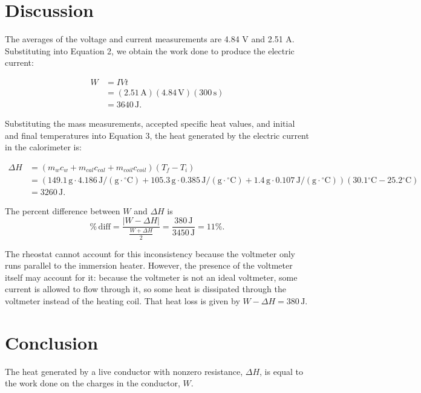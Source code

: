 \documentclass[11pt, titlepage, letterpaper, twoside]{article}
\begin{document}
\section{Discussion}

The averages of the voltage and current measurements are 4.84 V and 2.51 A. Substituting into Equation 2, we obtain the work done to produce the electric
current:

\begin{align*}
W &= IVt \\
  &= (2.51\,\mathrm{A})(4.84\,\mathrm{V})(300\,\mathrm{s}) \\
  &= 3640\,\mathrm{J}.
\end{align*}

Substituting the mass measurements, accepted specific heat values, and initial and final temperatures into Equation 3, the heat generated by the electric
current in the calorimeter is:

\newcommand{\degCm}{{^\circ\mathrm{C}}}
\newcommand{\JgCm}{\mathrm{J / (g \cdot \degCm) }}

\begin{align*}
\Delta H &= (m_wc_w + m_{cal}c_{cal} + m_{coil}c_{coil})(T_f - T_i) \\
         &= (149.1\,\mathrm{g} \cdot 4.186\,\JgCm + 105.3\,\mathrm{g} \cdot 0.385\,\JgCm + 1.4\,\mathrm{g} \cdot 0.107\,\JgCm)(30.1 \degCm - 25.2 \degCm) \\
         &= 3260\,\mathrm{J}.
\end{align*}

The percent difference between $W$ and $\Delta H$ is
$$
\mathrm{\%\,diff} = \frac{\left| W - \Delta H \right|}{\frac{W + \Delta H}{2}} = \frac{380\,\mathrm{J}}{3450\,\mathrm{J}} = 11\%.
$$

The rheostat cannot account for this inconsistency because the voltmeter only runs parallel to the immersion heater. However, the presence of the voltmeter
itself may account for it: because the voltmeter is not an ideal voltmeter, some current is allowed to flow through it, so some heat is dissipated through
the voltmeter instead of the heating coil. That heat loss is given by $W - \Delta H = 380\,\mathrm{J}$.

\section{Conclusion}

The heat generated by a live conductor with nonzero resistance, $\Delta H$, is equal to the work done on the charges in the conductor, $W$.
\end{document}
